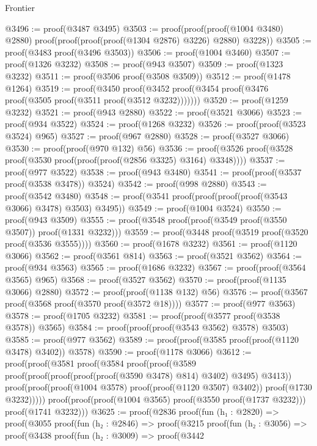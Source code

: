 \begin{lexlean}{Frontier}
\begin{coremodule}
@3496 := proof(@3487 @3495)
@3503 := proof(proof(proof(@1004 @3480) @2880)
      proof(proof(proof(proof(@1304 @2876) @3226) @2880) @3228))
@3505 := proof(@3483 proof(@3496 @3503))
@3506 := proof(@1004 @3460)
@3507 := proof(@1326 @3232)
@3508 := proof(@943 @3507)
@3509 := proof(@1323 @3232)
@3511 := proof(@3506 proof(@3508 @3509))
@3512 := proof(@1478 @1264)
@3519 := proof(@3450
      proof(@3452 proof(@3454 proof(@3476 proof(@3505 proof(@3511 proof(@3512 @3232)))))))
@3520 := proof(@1259 @3232)
@3521 := proof(@943 @2880)
@3522 := proof(@3521 @3066)
@3523 := proof(@934 @3522)
@3524 := proof(@1268 @3232)
@3526 := proof(proof(@3523 @3524) @965)
@3527 := proof(@967 @2880)
@3528 := proof(@3527 @3066)
@3530 := proof(proof(@970 @132) @56)
@3536 := proof(@3526 proof(@3528 proof(@3530 proof(proof(proof(@2856 @3325) @3164) @3348))))
@3537 := proof(@977 @3522)
@3538 := proof(@943 @3480)
@3541 := proof(proof(@3537 proof(@3538 @3478)) @3524)
@3542 := proof(@998 @2880)
@3543 := proof(@3542 @3480)
@3548 := proof(@3541 proof(proof(proof(proof(@3543 @3066) @3478) @3503) @3495))
@3549 := proof(@1004 @3524)
@3550 := proof(@943 @3509)
@3555 := proof(@3548 proof(proof(@3549 proof(@3550 @3507)) proof(@1331 @3232)))
@3559 := proof(@3448 proof(@3519 proof(@3520 proof(@3536 @3555))))
@3560 := proof(@1678 @3232)
@3561 := proof(@1120 @3066)
@3562 := proof(@3561 @814)
@3563 := proof(@3521 @3562)
@3564 := proof(@934 @3563)
@3565 := proof(@1686 @3232)
@3567 := proof(proof(@3564 @3565) @965)
@3568 := proof(@3527 @3562)
@3570 := proof(proof(@1135 @3066) @2880)
@3572 := proof(proof(@1138 @132) @56)
@3576 := proof(@3567 proof(@3568 proof(@3570 proof(@3572 @18))))
@3577 := proof(@977 @3563)
@3578 := proof(@1705 @3232)
@3581 := proof(proof(@3577 proof(@3538 @3578)) @3565)
@3584 := proof(proof(proof(@3543 @3562) @3578) @3503)
@3585 := proof(@977 @3562)
@3589 := proof(proof(@3585 proof(proof(@1120 @3478) @3402)) @3578)
@3590 := proof(@1178 @3066)
@3612 := proof(proof(@3581
        proof(@3584
            proof(proof(@3589 proof(proof(proof(proof(proof(@3590 @3478) @814) @3402) @3495) @3413))
                proof(proof(proof(@1004 @3578) proof(proof(@1120 @3507) @3402))
                    proof(@1730 @3232)))))
      proof(proof(proof(@1004 @3565) proof(@3550 proof(@1737 @3232))) proof(@1741 @3232)))
@3625 := proof(@2836
      proof(fun (h₁ : @2820) =>
        proof(@3055
            proof(fun (h₂ : @2846) =>
              proof(@3215
                  proof(fun (h₂ : @3056) =>
                    proof(@3438
                        proof(fun (h₂ : @3009) =>
                          proof(@3442

\end{coremodule}
\end{lexlean}
